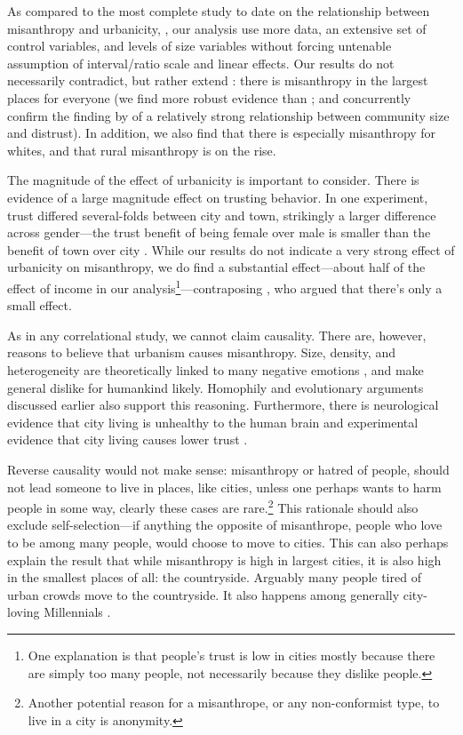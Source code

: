 \documentclass[11pt, letterpaper]{article}
\begin{document}
\begin{spacing}{1.4}
As compared to the most complete study to date on the relationship between
misanthropy and urbanicity, \citet{wilson85}, our analysis use more data, an extensive set of control variables, and levels of size variables without forcing untenable assumption of interval/ratio scale and linear effects. Our results do not necessarily contradict, but rather extend \citet{wilson85}: there is misanthropy in the largest places for everyone (we find more robust evidence than \citet{wilson85}; and concurrently confirm the finding by \citet{fischer81} of a relatively strong relationship between community size and distrust). In addition, we also find that there is especially misanthropy for whites, and that rural misanthropy is on the rise.

The magnitude of the effect of urbanicity is important to consider. There is evidence of a large magnitude effect on trusting behavior. In one experiment, trust differed several-folds between city and town, strikingly a larger difference across gender---the trust benefit of being female over male is smaller than the benefit of town over city \citep{milgram70}. While our results do not indicate a very strong effect of urbanicity on misanthropy, we do find a substantial effect---about half of the effect of income in our analysis\footnote{One explanation is that people's trust is low in cities mostly because there are simply too many people, not necessarily because they dislike people.}---contraposing \citet{wilson85}, who argued that there's only a small effect.

As in any correlational study, we cannot claim causality. There are, however, reasons to believe that urbanism causes misanthropy. Size, density, and heterogeneity are theoretically linked to many negative emotions \citep{wirth38}, and make general dislike for humankind likely. Homophily and evolutionary arguments discussed earlier also support this reasoning.  
Furthermore, there is neurological evidence that city living is unhealthy to the human brain \citep{lederbogen11} and experimental evidence that city living causes lower trust \citep{milgram70}.

Reverse causality would not make sense: misanthropy or hatred of people, should not lead someone to live in places, like cities, unless one perhaps wants to harm people in some way, clearly these cases are rare.\footnote{Another potential reason for a misanthrope, or any non-conformist type, to live in a city is anonymity.} This rationale should also exclude self-selection---if anything the opposite of misanthrope, people who love to be among many people, would choose to move to cities. This can also perhaps explain the result that while misanthropy is high in largest
cities, it is also high in the smallest places of all: the
countryside. {Arguably many people tired of urban crowds move to the
  countryside. It also happens among generally city-loving Millennials  \citep[e.g.,][]{deweyWP17nov23}.}


\end{spacing}
\end{document}
